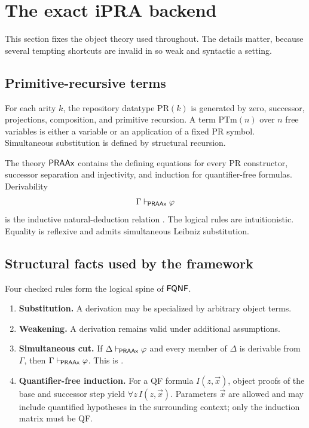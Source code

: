 \section{The exact iPRA backend}

This section fixes the object theory used throughout.  The details matter,
because several tempting shortcuts are invalid in so weak and syntactic a
setting.

\subsection{Primitive-recursive terms}

For each arity \(k\), the repository datatype \(\mathrm{PR}(k)\) is generated
by zero, successor, projections, composition, and primitive recursion.  A term
\(\mathrm{PTm}(n)\) over \(n\) free variables is either a variable or an
application of a fixed PR symbol.  Simultaneous substitution is defined by
structural recursion.

The theory \(\mathsf{PRAAx}\) contains the defining equations for every PR constructor,
successor separation and injectivity, and induction for quantifier-free
formulas.  Derivability
\[
   \Gamma\mathrel{\vdash_{\!\mathsf{PRAAx}}}\varphi
\]
is the inductive natural-deduction relation .
The logical rules are intuitionistic.  Equality is reflexive and admits
simultaneous Leibniz substitution.

\subsection{Structural facts used by the framework}

Four checked rules form the logical spine of \(\mathsf{FQNF}\).

\begin{enumerate}
\item \textbf{Substitution.}
A derivation may be specialized by arbitrary object terms.

\item \textbf{Weakening.}
A derivation remains valid under additional assumptions.

\item \textbf{Simultaneous cut.}
If \(\Delta\mathrel{\vdash_{\!\mathsf{PRAAx}}}\varphi\) and every member of \(\Delta\) is derivable
from \(\Gamma\), then \(\Gamma\mathrel{\vdash_{\!\mathsf{PRAAx}}}\varphi\).  This is
.

\item \textbf{Quantifier-free induction.}
For a QF formula \(I(z,\vec x)\), object proofs of the base and successor step
yield \(\forall z\,I(z,\vec x)\).  Parameters \(\vec x\) are allowed and may
include quantified hypotheses in the surrounding context; only the induction
matrix must be QF.
\end{enumerate}

